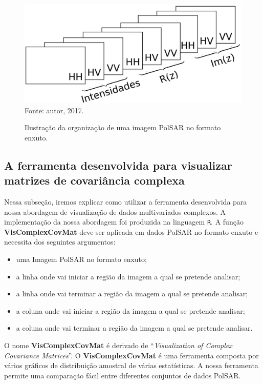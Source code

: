 \documentclass[a4paper,12pt]{article}
\begin{document}
\begin{figure}[!htb]
\centering
\caption{Ilustração da organização de uma imagem Pol{SAR} no formato enxuto.}
\includegraphics[width=\linewidth]{../../Images/camadas.png}\\
Fonte: autor, 2017.
\label{camadas}
\end{figure}  

\subsection{A ferramenta desenvolvida para visualizar matrizes de covariância complexa}\label{ferramenta}

Nessa subseção, iremos explicar como utilizar a ferramenta desenvolvida para nossa abordagem de visualização de dados multivariados complexos. A implementação da nossa abordagem foi produzida na linguagem {\tt R}. A função \textbf{VisComplexCovMat} deve ser aplicada em dados PolSAR no formato enxuto e necessita dos seguintes argumentos:
\begin{itemize}
\item uma Imagem PolSAR no formato enxuto;
\item a linha onde vai iniciar a região da imagem a qual se pretende analisar;
\item a linha onde vai terminar a região da imagem a qual se pretende analisar;  
\item a coluna onde vai iniciar a região da imagem a qual se pretende analisar;
\item a coluna onde vai terminar a região da imagem a qual se pretende analisar. 
\end{itemize}

O nome \textbf{VisComplexCovMat} é derivado de ``\textit{Visualization of Complex Covariance Matrices}''. O \textbf{VisComplexCovMat} é uma ferramenta composta por vários gráficos de distribuição amostral de várias estatísticas. A nossa ferramenta permite uma comparação fácil entre diferentes conjuntos de dados PolSAR.     
\end{document}
